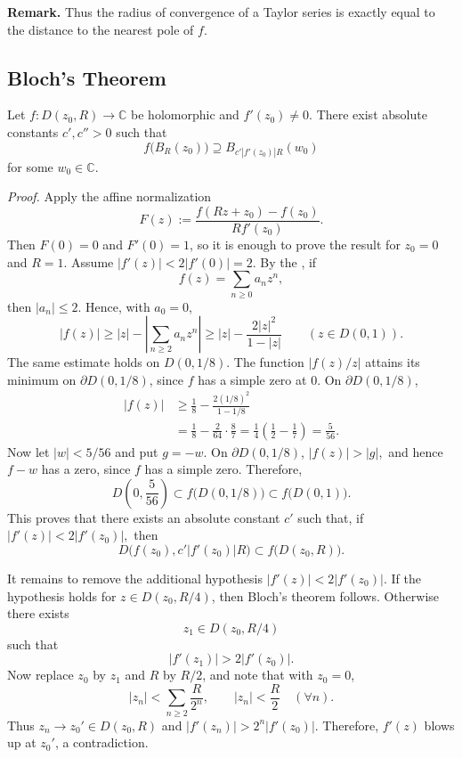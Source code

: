 \documentclass[11pt,a4paper]{article}
\begin{document}
\textbf{Remark.} Thus the radius of convergence of a Taylor series is exactly equal to the distance to the nearest pole of $f$.

\subsection*{Bloch's Theorem}

Let \(f:D(z_0,R)\to\mathbb C\)
be holomorphic and $f'(z_0)\ne0$. There exist absolute constants $c',c''>0$ such that
\[
  f\bigl(B_R(z_0)\bigr)
  \supseteq B_{c'|f'(z_0)|R}(w_0)
\]
for some $w_0\in\mathbb C$.


\textit{Proof.}
Apply the affine normalization
\[
  F(z):=\frac{f(Rz+z_0)-f(z_0)}{Rf'(z_0)}.
\]
Then \(F(0)=0\) and \(F'(0)=1\), so it is enough to prove the result for \(z_0=0\) and \(R=1\).
Assume \(|f'(z)|<2|f'(0)|=2.\)
By the , if
\[
  f(z)=\sum_{n\ge0}a_nz^n,
\]
then $|a_n|\le2$. Hence, with $a_0=0$,
\[
  |f(z)|\ge |z|-\left|\sum_{n\ge2}a_nz^n\right|
  \ge |z|-\frac{2|z|^2}{1-|z|}
  \qquad(z\in D(0,1)).
\]
The same estimate holds on $D(0,1/8)$. The function $|f(z)/z|$ attains its minimum on $\partial D(0,1/8)$, since $f$ has a simple zero at $0$. On $\partial D(0,1/8)$,
\begin{align*}
  |f(z)|
  &\ge \frac18-\frac{2(1/8)^2}{1-1/8}\\
  &=\frac18-\frac{2}{64}\cdot\frac87
   =\frac14\left(\frac12-\frac17\right)
   =\frac{5}{56}.
\end{align*}
Now let $|w|<5/56$ and put $g=-w$. On $\partial D(0,1/8)$, \(|f(z)|>|g|,\)
and hence $f-w$ has a zero, since $f$ has a simple zero. Therefore,
\[
  D\left(0,\frac{5}{56}\right)
  \subset f\bigl(D(0,1/8)\bigr)
  \subset f\bigl(D(0,1)\bigr).
\]
This proves that there exists an absolute constant $c'$ such that, if \(|f'(z)|<2|f'(z_0)|,\)
then
\[
  D\bigl(f(z_0),c'|f'(z_0)|R\bigr)
  \subset f\bigl(D(z_0,R)\bigr).
\]

It remains to remove the additional hypothesis $|f'(z)|<2|f'(z_0)|$. If the hypothesis holds for $z\in D(z_0,R/4)$, then Bloch's theorem follows. Otherwise there exists
\[
  z_1\in D(z_0,R/4)
\]
such that
\[
  |f'(z_1)|>2|f'(z_0)|.
\]
Now replace $z_0$ by $z_1$ and $R$ by $R/2$, and note that with $z_0=0$,
\[
  |z_n|<\sum_{n\ge2}\frac{R}{2^n},
  \qquad
  |z_n|<\frac R2\quad(\forall n).
\]
Thus $z_n\to z_0'\in D(z_0,R)$ and \(|f'(z_n)|>2^n|f'(z_0)|.\)
Therefore, $f'(z)$ blows up at $z_0'$, a contradiction.
\end{document}
